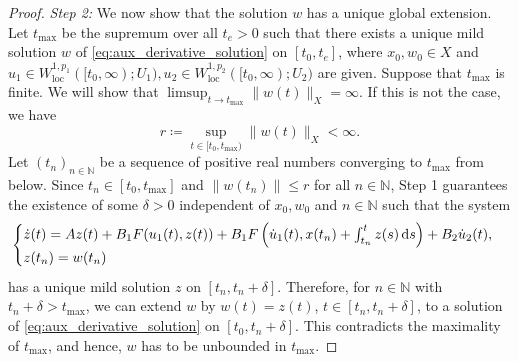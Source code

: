 \documentclass{cocv}
\newcommand{\ds}{ {\, \rm d} s}
\DeclareMathOperator{\loc}{loc}
\theoremstyle{definition}
\begin{document}
\begin{proof}
    
    \emph{Step 2:} We now show that the solution $w$ has a unique global extension.
    Let $ t_{\max} $ be the supremum over all $ t_e > 0 $ such that there exists a unique mild solution $w$ of \eqref{eq:aux_derivative_solution} on $[t_0, t_e]$, where $x_0, w_0 \in X$ and $u_1\in W^{1,{p_1}}_{\loc}([t_0,\infty);U_1), u_2\in W^{1,{p_2}}_{\loc}([t_0,\infty);U_2)$ are given.
    Suppose that $ t_{\max} $ is finite. We will show that $\limsup_{t \to t_{\max}} \|w(t)\|_X = \infty$. If this is not the case, we have
    \[
    r \coloneqq \sup_{t \in [t_0, t_{\max})} \|w(t)\|_X < \infty.
    \]
    Let $(t_n)_{n \in \mathbb{N}}$ be a sequence of positive real numbers converging to $ t_{\max} $ from below. Since $ t_n \in [t_0, t_{\max}] $ and $\|w(t_n)\| \leq r $ for all $ n \in \mathbb{N} $, Step 1 guarantees the existence of some $\delta > 0 $ independent of $x_0, w_0$ and $n \in \mathbb{N}$ 
    such that the system
    \begin{equation*}
        \begin{cases}
            \dot{z}(t) = Az(t) + B_1F(u_1(t),z(t)) +B_1F\left(\dot u_1(t), x(t_n) + \int_{t_n}^t z(s)\ds\right) +B_2\dot u_2(t), \\
            z(t_n) = w(t_n)
        \end{cases}
    \end{equation*}
    has a unique mild solution $ z $ on $[t_n, t_n + \delta]$. Therefore, for $ n \in \mathbb{N} $ with $ t_n + \delta > t_{\max} $, we can extend $ w $ by $ w(t) = z(t) $, $ t \in [t_n, t_n + \delta] $, to a solution of \eqref{eq:aux_derivative_solution} on $[t_0, t_n + \delta]$. This contradicts the maximality of $ t_{\max} $, and hence, $ w $ has to be unbounded in $ t_{\max} $.


\end{proof}
\end{document}
